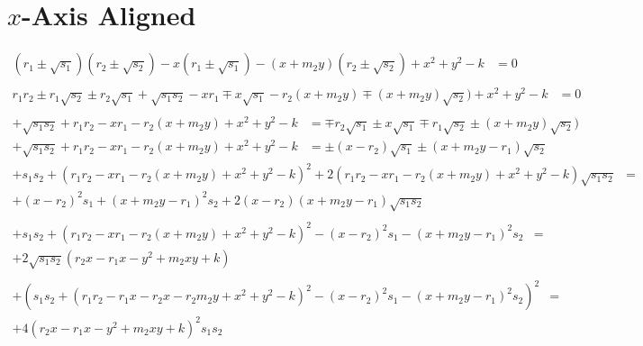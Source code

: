\documentclass{article}
\begin{document}
\section{$x$-Axis Aligned}
\begin{align*}
  (r_1 \pm \sqrt{s_1}) (r_2 \pm \sqrt{s_2}) - x (r_1 \pm \sqrt{s_1}) - (x + m_2 y) (r_2 \pm \sqrt{s_2}) + x^2 + y^2 - k &= 0\\
\end{align*}
\begin{align*}
  r_1 r_2 \pm r_1 \sqrt{s_2} \pm r_2 \sqrt{s_1} + \sqrt{s_1 s_2}
  - x r_1 \mp x \sqrt{s_1} - r_2 (x + m_2 y) \mp (x + m_2 y) \sqrt{s_2}) + x^2 + y^2 - k &= 0\\
\end{align*}
\begin{align*}
  + \sqrt{s_1 s_2}
  + r_1 r_2 - x r_1 - r_2 (x + m_2 y)
  + x^2 + y^2 - k &=
  \mp r_2 \sqrt{s_1}
  \pm x \sqrt{s_1}
  \mp r_1 \sqrt{s_2}
  \pm (x + m_2 y) \sqrt{s_2})
\end{align*}
\begin{align*}
  + \sqrt{s_1 s_2}
  + r_1 r_2 - x r_1 - r_2 (x + m_2 y) + x^2 + y^2 - k &=
  \pm (x - r_2) \sqrt{s_1}
  \pm (x + m_2 y - r_1) \sqrt{s_2}
\end{align*}
\begin{align*}
  + s_1 s_2 + (r_1 r_2 - x r_1 - r_2 (x + m_2 y) + x^2 + y^2 - k)^2
  + 2 (r_1 r_2 - x r_1 - r_2 (x + m_2 y) + x^2 + y^2 - k) \sqrt{s_1 s_2} &=\\
  + (x - r_2)^2 s_1 + (x + m_2 y - r_1)^2 s_2 + 2 (x - r_2) (x + m_2 y - r_1) \sqrt{s_1 s_2}\\
\end{align*}
\begin{align*}
  + s_1 s_2 + (r_1 r_2 - x r_1 - r_2 (x + m_2 y) + x^2 + y^2 - k)^2 - (x - r_2)^2 s_1 - (x + m_2 y - r_1)^2 s_2 &=\\
  + 2 \sqrt{s_1 s_2} (r_2 x - r_1 x - y^2 + m_2 x y + k)\\
\end{align*}
\begin{align*}
  + (s_1 s_2 + (r_1 r_2 - r_1 x - r_2 x - r_2 m_2 y + x^2 + y^2 - k)^2 - (x - r_2)^2 s_1 - (x + m_2 y - r_1)^2 s_2)^2 &=\\
  + 4 (r_2 x - r_1 x - y^2 + m_2 x y + k)^2 s_1 s_2 \\
\end{align*}
\end{document}
